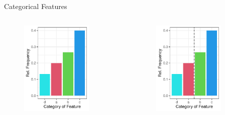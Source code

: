 \documentclass[11pt,compress,t,notes=noshow, xcolor=table]{beamer}
\begin{document}
\begin{frame}[noframenumbering]{Categorical Features}
\begin{columns}
\begin{column}{0.33\textwidth}
\begin{figure}
  \includegraphics[width=0.8\textwidth]{figure/categoryplot-binary2.pdf} 
  \end{figure}
  \end{column}
  \begin{column}{0.33\textwidth}
  \begin{figure}
  \includegraphics[width=0.8\textwidth]{figure/categoryplot-binary3.pdf} 
  \end{figure}
  \end{column}
  \end{columns}

\end{frame}
\end{document}
